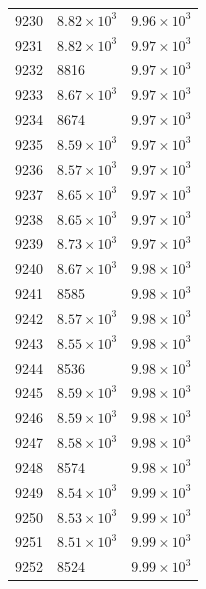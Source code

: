 \begin{table}[H]
\begin{tabular}{lll}
9230 & $\displaystyle 8.82 \times 10^{3}$ & $\displaystyle 9.96 \times 10^{3}$ \\
9231 & $\displaystyle 8.82 \times 10^{3}$ & $\displaystyle 9.97 \times 10^{3}$ \\
9232 & 8816 & $\displaystyle 9.97 \times 10^{3}$ \\
9233 & $\displaystyle 8.67 \times 10^{3}$ & $\displaystyle 9.97 \times 10^{3}$ \\
9234 & 8674 & $\displaystyle 9.97 \times 10^{3}$ \\
9235 & $\displaystyle 8.59 \times 10^{3}$ & $\displaystyle 9.97 \times 10^{3}$ \\
9236 & $\displaystyle 8.57 \times 10^{3}$ & $\displaystyle 9.97 \times 10^{3}$ \\
9237 & $\displaystyle 8.65 \times 10^{3}$ & $\displaystyle 9.97 \times 10^{3}$ \\
9238 & $\displaystyle 8.65 \times 10^{3}$ & $\displaystyle 9.97 \times 10^{3}$ \\
9239 & $\displaystyle 8.73 \times 10^{3}$ & $\displaystyle 9.97 \times 10^{3}$ \\
9240 & $\displaystyle 8.67 \times 10^{3}$ & $\displaystyle 9.98 \times 10^{3}$ \\
9241 & 8585 & $\displaystyle 9.98 \times 10^{3}$ \\
9242 & $\displaystyle 8.57 \times 10^{3}$ & $\displaystyle 9.98 \times 10^{3}$ \\
9243 & $\displaystyle 8.55 \times 10^{3}$ & $\displaystyle 9.98 \times 10^{3}$ \\
9244 & 8536 & $\displaystyle 9.98 \times 10^{3}$ \\
9245 & $\displaystyle 8.59 \times 10^{3}$ & $\displaystyle 9.98 \times 10^{3}$ \\
9246 & $\displaystyle 8.59 \times 10^{3}$ & $\displaystyle 9.98 \times 10^{3}$ \\
9247 & $\displaystyle 8.58 \times 10^{3}$ & $\displaystyle 9.98 \times 10^{3}$ \\
9248 & 8574 & $\displaystyle 9.98 \times 10^{3}$ \\
9249 & $\displaystyle 8.54 \times 10^{3}$ & $\displaystyle 9.99 \times 10^{3}$ \\
9250 & $\displaystyle 8.53 \times 10^{3}$ & $\displaystyle 9.99 \times 10^{3}$ \\
9251 & $\displaystyle 8.51 \times 10^{3}$ & $\displaystyle 9.99 \times 10^{3}$ \\
9252 & 8524 & $\displaystyle 9.99 \times 10^{3}$ \\

\end{tabular}
\end{table}
